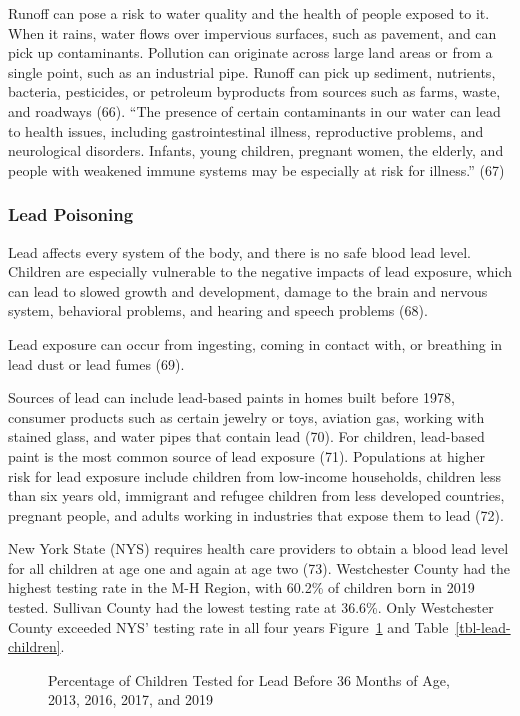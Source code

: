 \documentclass[
  english,
  letterpaper,
]{report}
\begin{document}
Runoff can pose a risk to water quality and the health of people exposed
to it. When it rains, water flows over impervious surfaces, such as
pavement, and can pick up contaminants. Pollution can originate across
large land areas or from a single point, such as an industrial pipe.
Runoff can pick up sediment, nutrients, bacteria, pesticides, or
petroleum byproducts from sources such as farms, waste, and roadways
(66). ``The presence of certain contaminants in our water can lead to
health issues, including gastrointestinal illness, reproductive
problems, and neurological disorders. Infants, young children, pregnant
women, the elderly, and people with weakened immune systems may be
especially at risk for illness.'' (67)

\subsubsection{Lead Poisoning}\label{lead-poisoning}

Lead affects every system of the body, and there is no safe blood lead
level. Children are especially vulnerable to the negative impacts of
lead exposure, which can lead to slowed growth and development, damage
to the brain and nervous system, behavioral problems, and hearing and
speech problems (68).

Lead exposure can occur from ingesting, coming in contact with, or
breathing in lead dust or lead fumes (69).

Sources of lead can include lead-based paints in homes built before
1978, consumer products such as certain jewelry or toys, aviation gas,
working with stained glass, and water pipes that contain lead (70). For
children, lead-based paint is the most common source of lead exposure
(71). Populations at higher risk for lead exposure include children from
low-income households, children less than six years old, immigrant and
refugee children from less developed countries, pregnant people, and
adults working in industries that expose them to lead (72).

New York State (NYS) requires health care providers to obtain a blood
lead level for all children at age one and again at age two (73).
Westchester County had the highest testing rate in the M-H Region, with
60.2\% of children born in 2019 tested. Sullivan County had the lowest
testing rate at 36.6\%. Only Westchester County exceeded NYS' testing
rate in all four years Figure~\ref{fig-lead-children} and
Table~\ref{tbl-lead-children}.

\begin{figure}


\caption{\label{fig-lead-children}Percentage of Children Tested for Lead
Before 36 Months of Age, 2013, 2016, 2017, and 2019}

\end{figure}%
\end{document}

